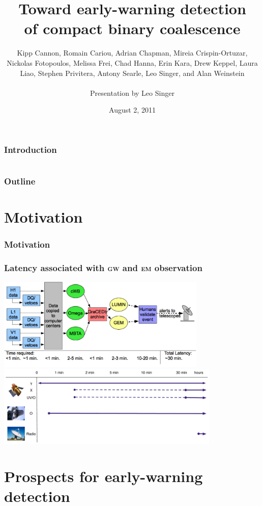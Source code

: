 \documentclass{beamer}
\title[LIGO-Gxxxxxxx-vx]{Toward early-warning detection \\ of compact binary coalescence}
\institute[LIGO Caltech]{LIGO Laboratory, California Institute of Technology}
\author[L Singer]{\footnotesize{
	Kipp Cannon,
	Romain Cariou,
	Adrian Chapman,
	Mireia Crispin-Ortuzar,
	Nickolas Fotopoulos,
	Melissa Frei,
	Chad Hanna,
	Erin Kara,
	Drew Keppel,
	Laura Liao,
	Stephen Privitera,
	Antony Searle,
	Leo Singer, and
	Alan Weinstein} \\~\\ Presentation by Leo Singer}
\date{August 2, 2011}
\begin{document}
\frame{\titlepage}


\begin{frame}
\frametitle{Introduction}
\end{frame}


\section[Outline]{}
\begin{frame}
	\frametitle{Outline}
	\tableofcontents
\end{frame}


\section{Motivation}

\begin{frame}
\frametitle{Motivation}
\end{frame}

\begin{frame}
	\frametitle{Latency associated with \textsc{gw} and \textsc{em} observation}
	\begin{center}
		\hspace{.5cm}\includegraphics[width=0.75\textwidth]{figures/Hughey_s6lowlatency_timeline} \\
		\includegraphics[width=0.8\textwidth]{figures/observation_timeline}
	\end{center}
\end{frame}

\section{Prospects for early-warning detection}
\end{document}
